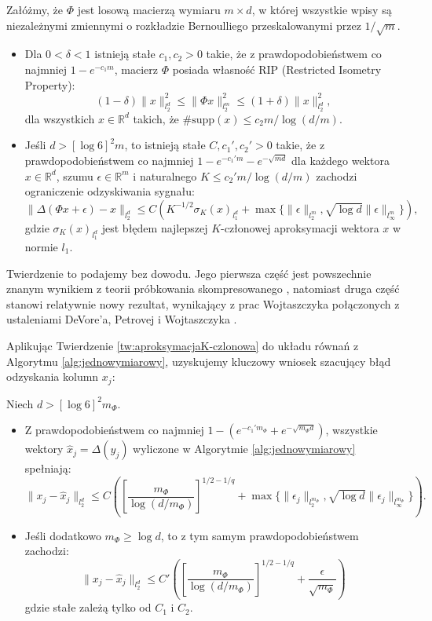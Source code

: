 \begin{tw}\label{tw:aproksymacjaK-czlonowa}
    Załóżmy, że $\Phi$ jest losową macierzą wymiaru $m \times d$, w której wszystkie wpisy są niezależnymi zmiennymi o rozkładzie Bernoulliego przeskalowanymi przez $1/\sqrt{m}$.
    \begin{itemize}
        \item Dla $0 < \delta < 1$ istnieją stałe $c_1, c_2 > 0$ takie, że z prawdopodobieństwem co najmniej $1 - e^{-c_1 m}$, macierz $\Phi$ posiada własność RIP (Restricted Isometry Property):
            $$(1-\delta)\|x\|_{l_2^d}^2 \le \|\Phi x\|_{l_2^m}^2 \le (1+\delta)\|x\|_{l_2^d}^2,$$ 
        dla wszystkich $x \in \mathbb{R}^d$ takich, że $\#\text{supp}(x) \le c_2 m / \log(d/m)$.
        \item Jeśli $d > [\log 6]^2 m$, to istnieją stałe $C, c_1', c_2' > 0$ takie, że z prawdopodobieństwem co najmniej $1 - e^{-c_1' m} - e^{-\sqrt{md}}$ dla każdego wektora $x \in \mathbb{R}^d$, szumu $\epsilon \in \mathbb{R}^m$ i naturalnego $K \le c_2' m / \log(d/m)$ zachodzi ograniczenie odzyskiwania sygnału:
            $$\|\Delta(\Phi x + \epsilon) - x\|_{l_2^d} \le C(K^{-1/2}\sigma_K(x)_{l_1^d} + \max\{\|\epsilon\|_{l_2^m}, \sqrt{\log d}\|\epsilon\|_{l_\infty^m}\}),$$ 
        gdzie $\sigma_K(x)_{l_1^d}$ jest błędem najlepszej $K$-członowej aproksymacji wektora $x$ w normie $l_1$.
    \end{itemize}
\end{tw}

Twierdzenie to podajemy bez dowodu. Jego pierwsza część jest powszechnie znanym wynikiem z teorii próbkowania skompresowanego \cite{baraniuk2008simple, fornasier2010numerical} , natomiast druga część stanowi relatywnie nowy rezultat, wynikający z prac Wojtaszczyka \cite{wojtaszczyk2012l1} połączonych z ustaleniami DeVore'a, Petrovej i Wojtaszczyka \cite{devore2009instance}.

Aplikując Twierdzenie \ref{tw:aproksymacjaK-czlonowa} do układu równań z Algorytmu \ref{alg:jednowymiarowy}, uzyskujemy kluczowy wniosek szacujący błąd odzyskania kolumn $x_j$:

\begin{wn}\label{wn:bladodzyskaniakolumn}
Niech $d > [\log 6]^2 m_\Phi$.
\begin{itemize}
    \item Z prawdopodobieństwem co najmniej $1 - (e^{-c_1' m_\Phi} + e^{-\sqrt{m_\Phi d}})$, wszystkie wektory $\hat{x}_j = \Delta(y_j)$ wyliczone w Algorytmie \ref{alg:jednowymiarowy} spełniają:
$$\|x_j - \hat{x}_j\|_{l_2^d} \le C\left(\left[\frac{m_\Phi}{\log(d/m_\Phi)}\right]^{1/2 - 1/q} + \max\{\|\epsilon_j\|_{l_2^{m_\Phi}}, \sqrt{\log d}\|\epsilon_j\|_{l_\infty^{m_\Phi}}\}\right).$$ 
    \item Jeśli dodatkowo $m_\Phi \ge \log d$, to z tym samym prawdopodobieństwem zachodzi:
$$\|x_j - \hat{x}_j\|_{l_2^d} \le C'\left(\left[\frac{m_\Phi}{\log(d/m_\Phi)}\right]^{1/2 - 1/q} + \frac{\epsilon}{\sqrt{m_\Phi}}\right)$$ 
gdzie stałe zależą tylko od $C_1$ i $C_2$.
\end{itemize}
\end{wn}

